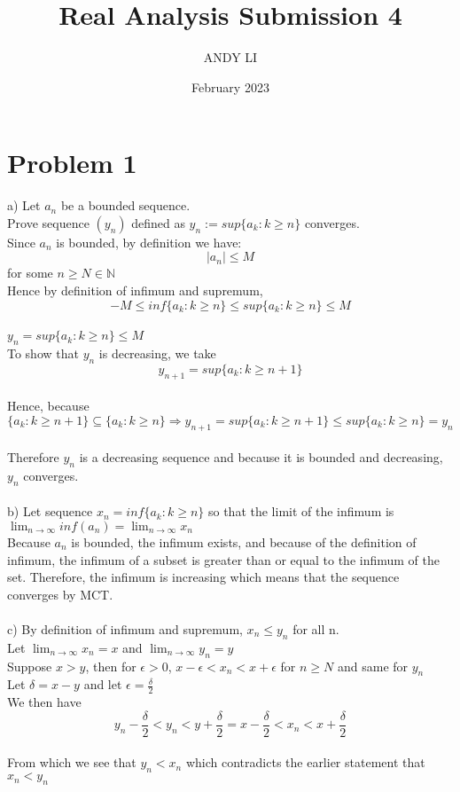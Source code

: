 \documentclass{article}
\title{Real Analysis Submission 4}
\author{ANDY LI}
\date{February 2023}
\begin{document}
\maketitle

\section*{Problem 1}
a) Let $a_n$ be a bounded sequence.
\\Prove sequence $(y_n)$ defined as $y_n := sup\{a_k: k \geq n\}$ converges.
\\Since $a_n$ is bounded, by definition we have: $$|a_n| \leq M$$ for some $n \geq N \in \mathbb{N}$
\\Hence by definition of infimum and supremum, $$-M \leq inf\{a_k : k \geq n\} \leq sup\{a_k : k \geq n\} \leq M$$
\\$y_n = sup\{a_k : k \geq n\} \leq M$
\\To show that $y_n$ is decreasing, we take $$y_{n+1} = sup\{a_k : k \geq n+1\}$$
\\Hence, because $$\{a_k : k \geq n+1\} \subseteq \{a_k : k \geq n\} \Rightarrow y_{n+1} = sup\{ a_k : k \geq n+1\} \leq sup\{a_k : k \geq n\} = y_n$$
\\Therefore $y_n$ is a decreasing sequence and because it is bounded and decreasing, $y_n$ converges.
\\
\\b) Let sequence $x_n = inf\{a_k : k \geq n\}$ so that the limit of the infimum is $\lim_{n \to \infty} inf(a_n) = \lim_{n \to \infty} x_n$
\\Because $a_n$ is bounded, the infimum exists, and because of the definition of infimum, the infimum of a subset is greater than or equal to the infimum of the set. Therefore, the infimum is increasing which means that the sequence converges by MCT.
\\
\\c) By definition of infimum and supremum, $x_n \leq y_n$ for all n.
\\Let $\lim_{n \to \infty} x_n = x$ and $\lim_{n \to \infty} y_n = y$
\\Suppose $x > y$, then for $\epsilon > 0$, $x - \epsilon < x_n < x + \epsilon$ for $n \geq N$ and same for $y_n$
\\Let $\delta = x - y$ and let $\epsilon = \frac{\delta}{2}$
\\We then have $$y_n - \frac{\delta}{2} < y_n < y + \frac{\delta}{2} = x - \frac{\delta}{2} < x_n < x + \frac{\delta}{2}$$
\\From which we see that $y_n < x_n$ which contradicts the earlier statement that $x_n < y_n$
\end{document}
